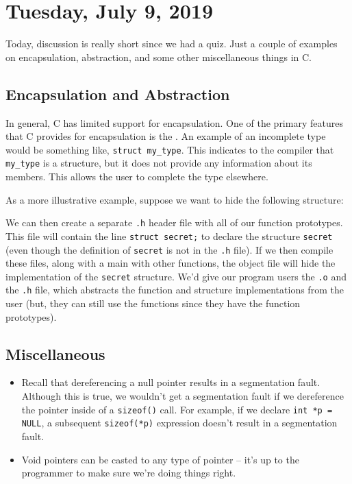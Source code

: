 \section{Tuesday, July 9, 2019}
Today, discussion is really short since we had a quiz. Just a couple of examples on encapsulation, abstraction, and some other miscellaneous things in C.


\subsection{Encapsulation and Abstraction}

In general, C has limited support for encapsulation. One of the primary features that C provides for encapsulation is the . An example of an incomplete type would be something like, \verb!struct my_type!. This indicates to the compiler that \verb!my_type! is a structure, but it does not provide any information about its members. This allows the user to complete the type elsewhere. 

As a more illustrative example, suppose we want to hide the following structure:


\lstset{
caption=Secret Structure
}
\begin{center}

\end{center}

We can then create a separate \verb!.h! header file with all of our function prototypes. This file will contain the line \verb!struct secret;! to declare the structure \verb!secret! (even though the definition of \verb!secret! is not in the \verb!.h! file).  If we then compile these files, along with a main with other functions, the object file will hide the implementation of the \verb!secret! structure. We'd give our program users the \verb!.o! and the \verb!.h! file, which abstracts the function and structure implementations from the user (but, they can still use the functions since they have the function prototypes).




\subsection{Miscellaneous}

\begin{itemize}
    \item Recall that dereferencing a null pointer results in a segmentation fault. Although this is true, we wouldn't get a segmentation fault if we dereference the pointer inside of a \verb!sizeof()! call. For example, if we declare \verb!int *p = NULL!, a subsequent \verb!sizeof(*p)! expression doesn't result in a segmentation fault.
    \item Void pointers can be casted to any type of pointer -- it's up to the programmer to make sure we're doing things right.
\end{itemize}

